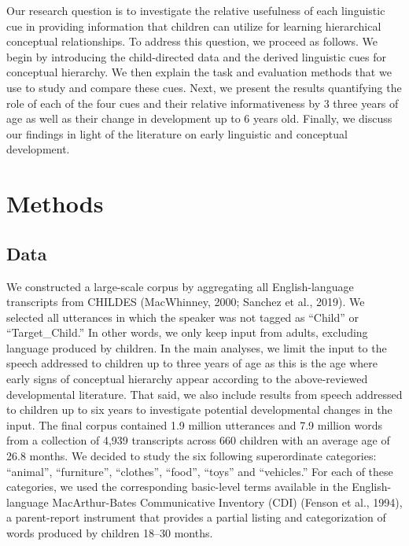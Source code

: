 \documentclass[english,,man]{apa6}
\begin{document}
Our research question is to investigate the relative usefulness of each linguistic cue in providing information that children can utilize for learning hierarchical conceptual relationships. To address this question, we proceed as follows. We begin by introducing the child-directed data and the derived linguistic cues for conceptual hierarchy. We then explain the task and evaluation methods that we use to study and compare these cues. Next, we present the results quantifying the role of each of the four cues and their relative informativeness by 3 three years of age as well as their change in development up to 6 years old. Finally, we discuss our findings in light of the literature on early linguistic and conceptual development.

\hypertarget{methods}{%
\section{Methods}\label{methods}}

\hypertarget{data}{%
\subsection{Data}\label{data}}

We constructed a large-scale corpus by aggregating all English-language transcripts from CHILDES (MacWhinney, 2000; Sanchez et al., 2019). We selected all utterances in which the speaker was not tagged as \enquote{Child} or \enquote{Target\_Child.} In other words, we only keep input from adults, excluding language produced by children. In the main analyses, we limit the input to the speech addressed to children up to three years of age as this is the age where early signs of conceptual hierarchy appear according to the above-reviewed developmental literature. That said, we also include results from speech addressed to children up to six years to investigate potential developmental changes in the input. The final corpus contained 1.9 million utterances and 7.9 million words from a collection of 4,939 transcripts across 660 children with an average age of 26.8 months. We decided to study the six following superordinate categories: \enquote{animal}, \enquote{furniture}, \enquote{clothes}, \enquote{food}, \enquote{toys} and \enquote{vehicles.} For each of these categories, we used the corresponding basic-level terms available in the English-language MacArthur-Bates Communicative Inventory (CDI) (Fenson et al., 1994), a parent-report instrument that provides a partial listing and categorization of words produced by children 18--30 months.
\end{document}
